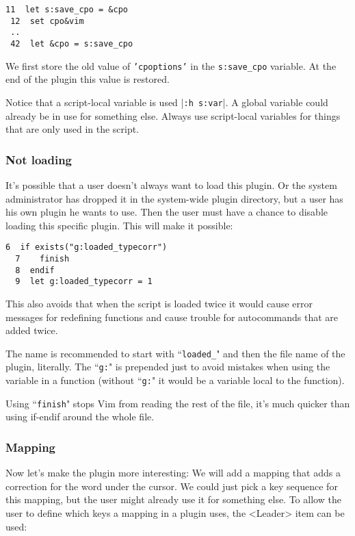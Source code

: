 \begin{Verbatim}[samepage=true]
 11  let s:save_cpo = &cpo
 12  set cpo&vim
 ..
 42  let &cpo = s:save_cpo
\end{Verbatim}

We first store the old value of \texttt{'cpoptions'} in the \texttt{s:save\_cpo} variable.
At the end of the plugin this value is restored.

Notice that a script-local variable is used |\texttt{:h s:var}|.
A global variable could already be in use for something else.
Always use script-local variables for things that are only used in the script.

\subsubsection{Not loading}
It's possible that a user doesn't always want to load this plugin.
Or the system administrator has dropped it in the system-wide plugin directory, but a user has his own plugin he wants to use.
Then the user must have a chance to disable loading this specific plugin.
This will make it possible:

\begin{Verbatim}[samepage=true]
  6  if exists("g:loaded_typecorr")
  7    finish
  8  endif
  9  let g:loaded_typecorr = 1
\end{Verbatim}

This also avoids that when the script is loaded twice it would cause error messages for redefining functions and cause trouble for autocommands that are added twice.

The name is recommended to start with ``\texttt{loaded\_}" and then the file name of the plugin, literally.
The ``\texttt{g:}" is prepended just to avoid mistakes when using the variable in a function (without ``\texttt{g:}" it would be a variable local to the function).

Using ``\texttt{finish}" stops Vim from reading the rest of the file, it's much quicker than using if-endif around the whole file.

\subsubsection{Mapping}
Now let's make the plugin more interesting: We will add a mapping that adds a correction for the word under the cursor.
We could just pick a key sequence for this mapping, but the user might already use it for something else.
To allow the user to define which keys a mapping in a plugin uses, the <Leader> item can be used:

